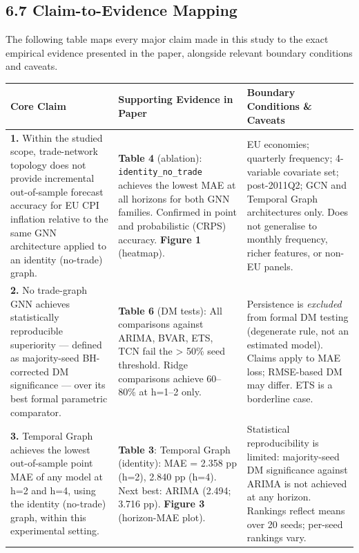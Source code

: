 \documentclass[
]{article}
\newcounter{none} %
\begin{document}
\subsection{6.7 Claim-to-Evidence Mapping}\label{claim-to-evidence-mapping}

The following table maps every major claim made in this study to the exact empirical evidence presented in the paper, alongside relevant boundary conditions and caveats.

{\def\LTcaptype{none} %
\begin{longtable}[]{@{}
  >{\raggedright\arraybackslash}p{}
  >{\raggedright\arraybackslash}p{}
  >{\raggedright\arraybackslash}p{}@{}}
\toprule\noalign{}
Core Claim & Supporting Evidence in Paper & Boundary Conditions \& Caveats \\
\midrule\noalign{}
\endhead
\bottomrule\noalign{}
\endlastfoot
\textbf{1.} Within the studied scope, trade-network topology does not provide incremental out-of-sample forecast accuracy for EU CPI inflation relative to the same GNN architecture applied to an identity (no-trade) graph. & \textbf{Table 4} (ablation): \texttt{identity\_no\_trade} achieves the lowest MAE at all horizons for both GNN families. Confirmed in point and probabilistic (CRPS) accuracy. \textbf{Figure 1} (heatmap). & 20 EU economies; quarterly frequency; 4-variable covariate set; post-2011Q2; GCN and Temporal Graph architectures only. Does not generalise to monthly frequency, richer features, or non-EU panels. \\
\textbf{2.} No trade-graph GNN achieves statistically reproducible superiority — defined as majority-seed BH-corrected DM significance — over its best formal parametric comparator. & \textbf{Table 6} (DM tests): All comparisons against ARIMA, BVAR, ETS, TCN fail the > 50\% seed threshold. Ridge comparisons achieve 60–80\% at h=1–2 only. & Persistence is \emph{excluded} from formal DM testing (degenerate rule, not an estimated model). Claims apply to MAE loss; RMSE-based DM may differ. ETS is a borderline case. \\
\textbf{3.} Temporal Graph achieves the lowest out-of-sample point MAE of any model at h=2 and h=4, using the identity (no-trade) graph, within this experimental setting. & \textbf{Table 3}: Temporal Graph (identity): MAE = 2.358 pp (h=2), 2.840 pp (h=4). Next best: ARIMA (2.494; 3.716 pp). \textbf{Figure 3} (horizon-MAE plot). & Statistical reproducibility is limited: majority-seed DM significance against ARIMA is not achieved at any horizon. Rankings reflect means over 20 seeds; per-seed rankings vary. \\

\end{longtable}}
\end{document}
